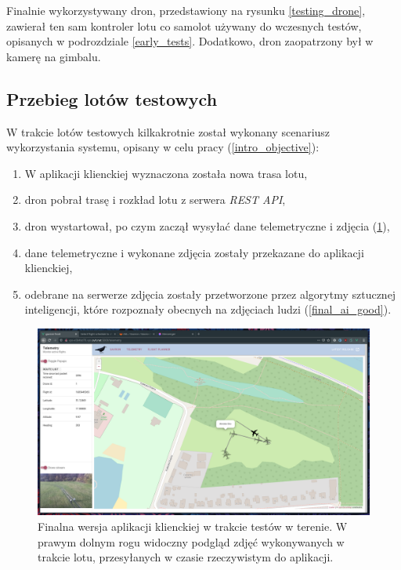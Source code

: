 Finalnie wykorzystywany dron, przedstawiony na rysunku \ref{testing_drone}, zawierał
ten sam kontroler lotu co samolot używany do wczesnych testów, opisanych w podrozdziale 
\ref{early_tests}. Dodatkowo, dron zaopatrzony był w kamerę na gimbalu.

\subsection{Przebieg lotów testowych}

W trakcie lotów testowych kilkakrotnie został wykonany scenariusz 
wykorzystania systemu, opisany w celu pracy (\ref{intro_objective}):

\begin{enumerate}
    \item W aplikacji klienckiej wyznaczona została nowa trasa lotu,
    \item dron pobrał trasę i rozkład lotu z serwera \textit{REST API},
    \item dron wystartował, po czym zaczął wysyłać dane telemetryczne i zdjęcia (\ref{final_frontend}),
    \item dane telemetryczne i wykonane zdjęcia zostały przekazane do aplikacji klienckiej,
    \item odebrane na serwerze zdjęcia zostały przetworzone przez algorytmy sztucznej inteligencji,
        które rozpoznały obecnych na zdjęciach ludzi (\ref{final_ai_good}).
\end{enumerate}

\begin{figure}[H]
	\centering
	\includegraphics[width=0.8\linewidth]{rys05/final_flight_telem.png}
    \caption{
        Finalna wersja aplikacji klienckiej w trakcie testów w terenie. 
        W prawym dolnym rogu widoczny podgląd zdjęć wykonywanych w trakcie lotu,
        przesyłanych w czasie rzeczywistym do aplikacji.
    }
	\label{final_frontend}
\end{figure}

